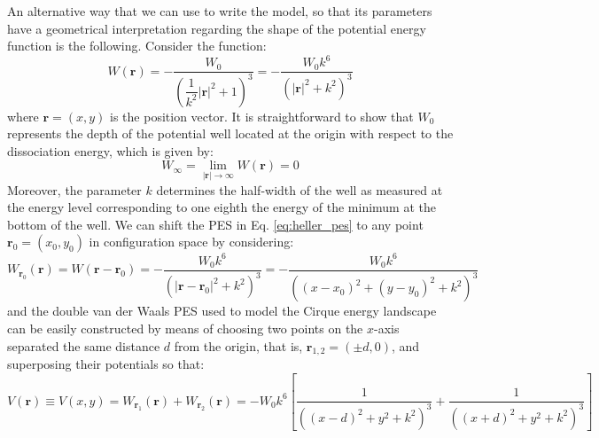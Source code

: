 \documentclass[10pt,aps,onecolumn,superscriptaddress]{revtex4-2}
\begin{document}
An alternative way that we can use to write the model, so that its parameters have a geometrical interpretation regarding the shape of the potential energy function is the following. Consider the function:
\begin{equation}
W(\mathbf{r}) = - \dfrac{W_0}{\left(\dfrac{1}{k^2} |\mathbf{r}|^2 + 1\right)^3} = - \dfrac{W_0 k^6}{\left( |\mathbf{r}|^2 + k^2\right)^3}
\label{eq:heller_pes}
\end{equation}
where $\mathbf{r} = (x,y)$ is the position vector. It is straightforward to show that $W_0$ represents the depth of the potential well located at the origin with respect to the dissociation energy, which is given by:
\begin{equation}
W_{\infty} = \lim_{|\mathbf{r}| \to \infty} W(\mathbf{r}) = 0
\end{equation}
Moreover, the parameter $k$ determines the half-width of the well as measured at the energy level corresponding to one eighth the energy of the minimum at the bottom of the well. We can shift the PES in Eq. \eqref{eq:heller_pes} to any point $\mathbf{r}_0 = (x_0,y_0)$ in configuration space by considering:
\begin{equation}
W_{\mathbf{r}_0}(\mathbf{r}) = W(\mathbf{r} - \mathbf{r}_0) = - \dfrac{W_0 k^6}{\left( |\mathbf{r} - \mathbf{r}_0|^2 + k^2\right)^3} = - \dfrac{W_0 k^6}{\left(\left(x-x_0\right)^2 + \left(y-y_0\right)^2 + k^2\right)^3}
\end{equation}
and the double van der Waals PES used to model the Cirque energy landscape can be easily constructed by means of choosing two points on the $x$-axis separated the same distance $d$ from the origin, that is, $\mathbf{r}_{1,2} = (\pm d,0)$, and superposing their potentials so that:
\begin{equation}
V(\mathbf{r}) \equiv V(x,y) =  W_{\mathbf{r}_1}(\mathbf{r}) + W_{\mathbf{r}_2}(\mathbf{r})
= - W_0 k^6 \left[\dfrac{1}{\left(\left(x - d\right)^2 + y^2 + k^2\right)^3} + \dfrac{1}{\left(\left(x + d\right)^2 + y^2 + k^2\right)^3} \right]
\end{equation}
\end{document}
